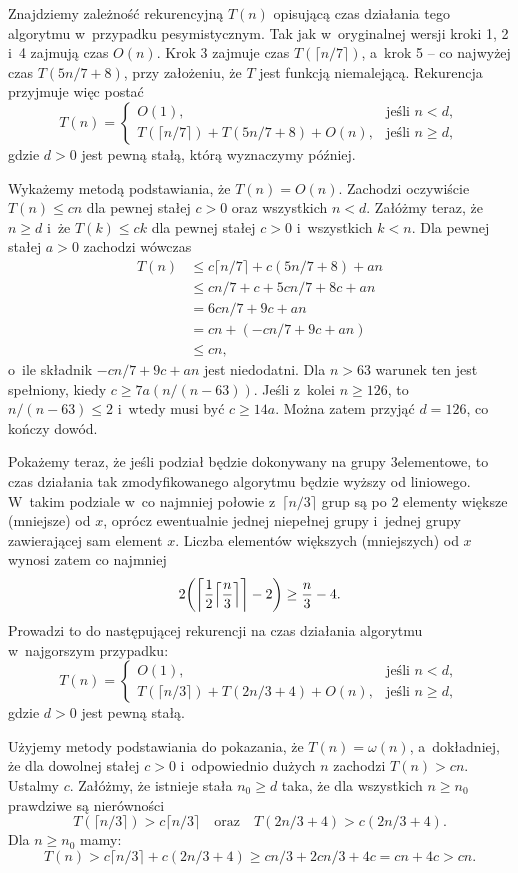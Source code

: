 Znajdziemy zależność rekurencyjną $T(n)$ opisującą czas działania tego algorytmu w~przypadku pesymistycznym.
Tak jak w~oryginalnej wersji kroki 1, 2 i~4 zajmują czas $O(n)$.
Krok 3 zajmuje czas $T(\lceil n/7\rceil)$, a~krok 5 -- co najwyżej czas $T(5n/7+8)$, przy założeniu, że $T$ jest funkcją niemalejącą.
Rekurencja przyjmuje więc postać
\[
	T(n) = \begin{cases}
		O(1), & \text{jeśli $n<d$}, \\
		T(\lceil n/7\rceil)+T(5n/7+8)+O(n), & \text{jeśli $n\ge d$},
	\end{cases}
\]
gdzie $d>0$ jest pewną stałą, którą wyznaczymy później.

Wykażemy metodą podstawiania, że $T(n)=O(n)$.
Zachodzi oczywiście $T(n)\le cn$ dla pewnej stałej $c>0$ oraz wszystkich $n<d$.
Załóżmy teraz, że $n\ge d$ i~że $T(k)\le ck$ dla pewnej stałej $c>0$ i~wszystkich $k<n$.
Dla pewnej stałej $a>0$ zachodzi wówczas
\begin{align*}
	T(n) &\le c\lceil n/7\rceil+c(5n/7+8)+an \\
	&\le cn/7+c+5cn/7+8c+an \\
	&= 6cn/7+9c+an \\
	&= cn+(-cn/7+9c+an) \\
	&\le cn,
\end{align*}
o~ile składnik $-cn/7+9c+an$ jest niedodatni.
Dla $n>63$ warunek ten jest spełniony, kiedy $c\ge7a(n/(n-63))$.
Jeśli z~kolei $n\ge126$, to $n/(n-63)\le2$ i~wtedy musi być $c\ge14a$.
Można zatem przyjąć $d=126$, co kończy dowód.

Pokażemy teraz, że jeśli podział będzie dokonywany na grupy 3\nbhyphen elementowe, to czas działania tak zmodyfikowanego algorytmu  będzie wyższy od liniowego.
W~takim podziale w~co najmniej połowie z~$\lceil n/3\rceil$ grup są po 2 elementy większe (mniejsze) od $x$, oprócz ewentualnie jednej niepełnej grupy i~jednej grupy zawierającej sam element $x$.
Liczba elementów większych (mniejszych) od $x$ wynosi zatem co najmniej
\[
	2\biggl(\biggl\lceil\frac{1}{2}\Bigl\lceil\frac{n}{3}\Bigr\rceil\biggr\rceil-2\biggr) \ge \frac{n}{3}-4.
\]
Prowadzi to do następującej rekurencji na czas działania algorytmu w~najgorszym przypadku:
\[
	T(n) = \begin{cases}
		O(1), & \text{jeśli $n<d$}, \\
		T(\lceil n/3\rceil)+T(2n/3+4)+O(n), & \text{jeśli $n\ge d$},
	\end{cases}
\]
gdzie $d>0$ jest pewną stałą.

Użyjemy metody podstawiania do pokazania, że $T(n)=\omega(n)$, a~dokładniej, że dla dowolnej stałej $c>0$ i~odpowiednio dużych $n$ zachodzi $T(n)>cn$.
Ustalmy $c$.
Załóżmy, że istnieje stała $n_0\ge d$ taka, że dla wszystkich $n\ge n_0$ prawdziwe są nierówności
\[
	T(\lceil n/3\rceil) > c\lceil n/3\rceil \quad\text{oraz}\quad T(2n/3+4) > c(2n/3+4).
\]
Dla $n\ge n_0$ mamy:
\[
	T(n) > c\lceil n/3\rceil+c(2n/3+4) \ge cn/3+2cn/3+4c = cn+4c > cn.
\]

